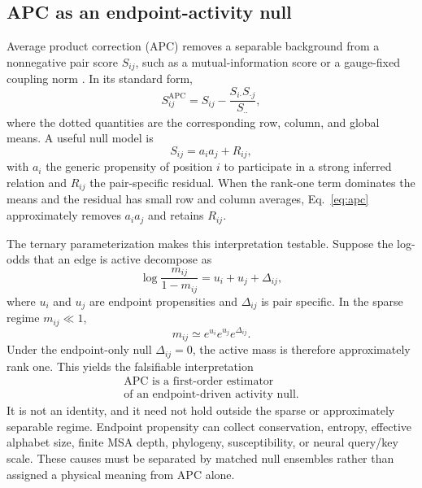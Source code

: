 \documentclass[10pt,twocolumn]{article}
\newcommand{\1}{\mathbf 1}
\theoremstyle{remark}
\begin{document}
\subsection{APC as an endpoint-activity null}

Average product correction (APC) removes a separable background from a nonnegative pair score
$S_{ij}$, such as a mutual-information score or a gauge-fixed coupling norm
\cite{dunn2008}.  In its standard form,
\begin{equation}
S_{ij}^{\mathrm{APC}}
=S_{ij}-\frac{S_{i\boldsymbol\cdot}S_{\boldsymbol\cdot j}}
{S_{\boldsymbol\cdot\boldsymbol\cdot}},
\label{eq:apc}
\end{equation}
where the dotted quantities are the corresponding row, column, and global means.  A useful null
model is
\begin{equation}
S_{ij}=a_i a_j+R_{ij},
\label{eq:endpoint-score-null}
\end{equation}
with $a_i$ the generic propensity of position $i$ to participate in a strong inferred relation and
$R_{ij}$ the pair-specific residual.  When the rank-one term dominates the means and the residual
has small row and column averages, Eq.~\ref{eq:apc} approximately removes $a_i a_j$ and retains
$R_{ij}$.

The ternary parameterization makes this interpretation testable.  Suppose the log-odds that an
edge is active decompose as
\begin{equation}
\log\frac{m_{ij}}{1-m_{ij}}
=u_i+u_j+\Delta_{ij},
\label{eq:activity-null}
\end{equation}
where $u_i$ and $u_j$ are endpoint propensities and $\Delta_{ij}$ is pair specific.  In the sparse
regime $m_{ij}\ll1$,
\begin{equation}
m_{ij}\simeq e^{u_i}e^{u_j}e^{\Delta_{ij}}.
\label{eq:sparse-activity-factorization}
\end{equation}
Under the endpoint-only null $\Delta_{ij}=0$, the active mass is therefore approximately rank one.
This yields the falsifiable interpretation
\begin{equation}
\boxed{
\begin{gathered}
\text{APC is a first-order estimator}\\
\text{of an endpoint-driven activity null.}
\end{gathered}}
\label{eq:apc-interpretation}
\end{equation}
It is not an identity, and it need not hold outside the sparse or approximately separable regime.
Endpoint propensity can collect conservation, entropy, effective alphabet size, finite MSA depth,
phylogeny, susceptibility, or neural query/key scale.  These causes must be separated by matched
null ensembles rather than assigned a physical meaning from APC alone.
\end{document}
